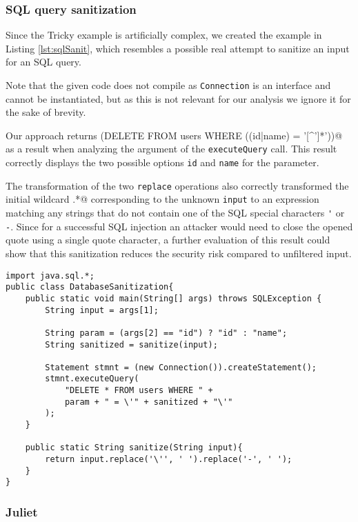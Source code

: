 \newpage
\subsubsection{SQL query sanitization}

Since the Tricky example is artificially complex, we created the example in Listing \ref{lst:sqlSanit}, which resembles a possible real attempt to sanitize an input for an SQL query.

Note that the given code does not compile as \lstinline|Connection| is an interface and cannot be instantiated, but as this is not relevant for our analysis we ignore it for the sake of brevity.

Our approach returns \Verb@(DELETE \* FROM users WHERE ((id|name) = '[^'\-]*'))@ as a result when analyzing the argument of the \lstinline|executeQuery| call. This result correctly displays the two possible options \lstinline|id| and \lstinline|name| for the parameter.

The transformation of the two \lstinline|replace| operations also correctly transformed the initial wildcard \Verb@.*@ corresponding to the unknown \lstinline|input| to an expression matching any strings that do not contain one of the SQL special characters \lstinline|'| or \lstinline|-|. Since for a successful SQL injection an attacker would need to close the opened quote using a single quote character, a further evaluation of this result could show that this sanitization reduces the security risk compared to unfiltered input.

\begin{lstlisting}[float, escapechar=|, numbers=right, caption=SQL query sanitization example, label=lst:sqlSanit,basicstyle=\small\ttfamily]
import java.sql.*;
public class DatabaseSanitization{
	public static void main(String[] args) throws SQLException {
		String input = args[1];
		
		String param = (args[2] == "id") ? "id" : "name";
		String sanitized = sanitize(input);
		
		Statement stmnt = (new Connection()).createStatement();
		stmnt.executeQuery(
			"DELETE * FROM users WHERE " + 
			param + " = \'" + sanitized + "\'"
		);
	}
	
	public static String sanitize(String input){
		return input.replace('\'', ' ').replace('-', ' ');
	}
}
\end{lstlisting}

\subsubsection{Juliet}

